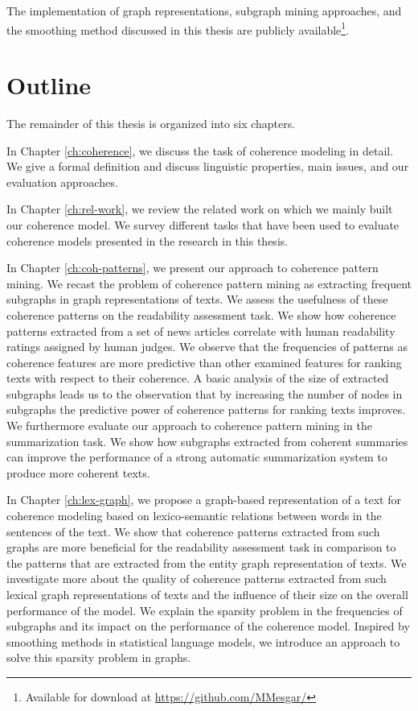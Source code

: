 The implementation of graph representations, subgraph mining approaches, and the smoothing method discussed in this thesis are publicly available\footnote{Available for download at \url{https://github.com/MMesgar/}}. 


\section{Outline}
\label{sec:intro-outline}
The remainder of this thesis is organized into six chapters. 

In Chapter \ref{ch:coherence}, we discuss the task of coherence modeling in detail. 
We give a formal definition and discuss linguistic properties, main issues, and our evaluation approaches. 

In Chapter \ref{ch:rel-work}, we review the related work on which we mainly built our coherence model. 
We survey different tasks that have been used to evaluate coherence models presented in the research in this thesis. 

In Chapter \ref{ch:coh-patterns}, we present our approach to coherence pattern mining. 
We recast the problem of coherence pattern mining as extracting frequent subgraphs in graph representations of texts. 
We assess the usefulness of these coherence patterns on the readability assessment task. 
We show how coherence patterns extracted from a set of news articles correlate with human readability ratings assigned by human judges. 
We observe that the frequencies of patterns as coherence features are more predictive than other examined features for ranking texts with respect to their coherence. 
A basic analysis of the size of extracted subgraphs leads us to the observation that by increasing the number of nodes in subgraphs the predictive power of coherence patterns for ranking texts improves. 
We furthermore evaluate our approach to coherence pattern mining in the summarization task.  
We show how subgraphs extracted from coherent summaries can improve the performance of a strong automatic summarization system to produce more coherent texts. 

In Chapter \ref{ch:lex-graph}, we propose a graph-based representation of a text for coherence modeling based on lexico-semantic relations between words in the sentences of the text.  
We show that coherence patterns extracted from such graphs are more beneficial for the readability assessment task in comparison to the patterns that are extracted from the entity graph representation of texts. 
We investigate more about the quality of coherence patterns extracted from such lexical graph representations of texts and the influence of their size on the overall performance of the model.   
We explain the sparsity problem in the frequencies of subgraphs and its impact on the performance of the coherence model. Inspired by smoothing methods in statistical language models, we introduce an approach to solve this sparsity problem in graphs.  


